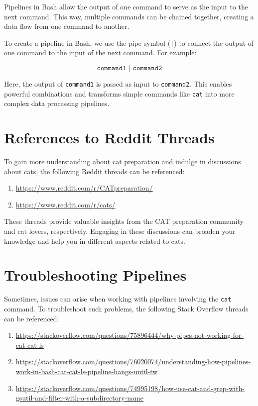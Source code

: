 \documentclass{article}
\begin{document}
Pipelines in Bash allow the output of one command to serve as the input to the next command. This way, multiple commands can be chained together, creating a data flow from one command to another.

To create a pipeline in Bash, we use the pipe symbol (\texttt{|}) to connect the output of one command to the input of the next command. For example:

\[
\texttt{command1 | command2}
\]

Here, the output of \texttt{command1} is passed as input to \texttt{command2}. This enables powerful combinations and transforms simple commands like \texttt{cat} into more complex data processing pipelines.

\section{References to Reddit Threads}

To gain more understanding about cat preparation and indulge in discussions about cats, the following Reddit threads can be referenced:

\begin{enumerate}
  \item \url{https://www.reddit.com/r/CATpreparation/}
  \item \url{https://www.reddit.com/r/cats/}
\end{enumerate}

These threads provide valuable insights from the CAT preparation community and cat lovers, respectively. Engaging in these discussions can broaden your knowledge and help you in different aspects related to cats.

\section{Troubleshooting Pipelines}

Sometimes, issues can arise when working with pipelines involving the \texttt{cat} command. To troubleshoot such problems, the following Stack Overflow threads can be referenced:

\begin{enumerate}
  \item \url{https://stackoverflow.com/questions/75896444/why-pipes-not-working-for-cat-cat-ls}
  \item \url{https://stackoverflow.com/questions/76020074/understanding-how-pipelines-work-in-bash-cat-cat-ls-pipeline-hangs-until-tw}
  \item \url{https://stackoverflow.com/questions/74995198/how-use-cat-and-grep-with-gsutil-and-filter-with-a-subdirectory-name}
\end{enumerate}
\end{document}
